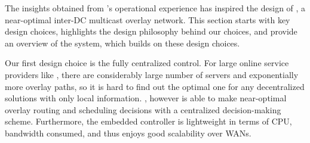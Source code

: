 




\begin{table}[t]
\centering
{}
\caption{\name's design choices and their benefit-cost tradeoffs}
\label{tab:design-choices}
\end{table}

The insights obtained from \company's operational experience has inspired the design of \name, a near-optimal inter-DC multicast overlay network. This section starts with \name key design choices, highlights the design philosophy behind our choices, and provide an overview of the \name system, which builds on these design choices.

Our first design choice is the fully centralized control. For large online service providers like \company, there are considerably large number of servers and exponentially more overlay paths, so it is hard to find out the optimal one for any decentralized solutions with only local information. \name, however is able to make near-optimal overlay routing and scheduling decisions with a centralized decision-making scheme. Furthermore, the embedded controller is lightweight in terms of CPU, bandwidth consumed, and thus enjoys good scalability over WANs.

